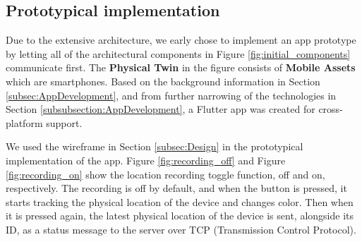 \documentclass{article}
\begin{document}
\subsection{Prototypical implementation}\label{subsec:Prototypical}
Due to the extensive architecture, we early chose to implement an app prototype by letting all of the architectural components in Figure \ref{fig:initial_components} communicate first. The \textbf{Physical Twin} in the figure consists of \textbf{Mobile Assets} which are smartphones. Based on the background information in Section \ref{subsec:AppDevelopment}, and from further narrowing of the technologies in Section \ref{subsubsection:AppDevelopment}, a Flutter app was created for cross-platform support.

We used the wireframe in Section \ref{subsec:Design} in the prototypical implementation of the app. Figure \ref{fig:recording_off} and Figure \ref{fig:recording_on} show the location recording toggle function, off and on, respectively. The recording is off by default, and when the button is pressed, it starts tracking the physical location of the device and changes color. Then when it is pressed again, the latest physical location of the device is sent, alongside its ID, as a status message to the server over TCP (Transmission Control Protocol).
\end{document}

